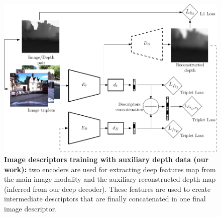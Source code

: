 \begin{figure}

		\centering
		
		\includegraphics[width=\linewidth]{method/our_method_training}
		\caption[Image descriptors training with auxiliary depth data]{\label{fig:our_method} \textbf{Image descriptors training with auxiliary depth data (our work):} two encoders are used for extracting deep features map from the main image modality and the auxiliary reconstructed depth map (inferred from our deep decoder). These features are used to create intermediate descriptors that are finally concatenated in one final image descriptor.}	

\end{figure}
	